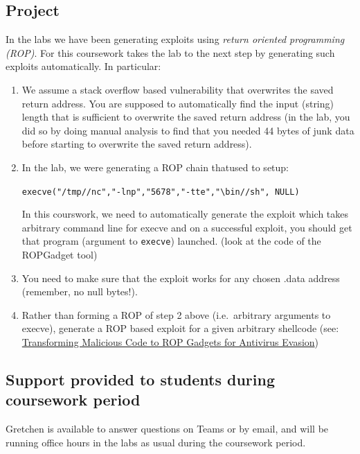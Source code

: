 \documentclass{article}
\begin{document}
\subsection*{Project}

In the labs we have been generating exploits using \emph{return oriented programming (ROP)}. For this coursework
takes the lab to the next step by generating such exploits
automatically. In particular:

\begin{enumerate}
\item We assume a stack overflow based vulnerability that overwrites the
  saved return address. You are supposed to automatically find the input
  (string) length that is sufficient to overwrite the saved return address (in the
  lab, you did so by doing manual analysis to find that you needed 44
  bytes of junk data before starting to overwrite the saved return address).

\item In the lab, we were generating a ROP chain thatused to setup:

  \texttt{execve("/tmp//nc","-lnp","5678","-tte","\textbackslash bin//sh",
    NULL)}

  In this courswork, we need to automatically generate the exploit
  which takes arbitrary command line for execve and on a successful
  exploit, you should get that program (argument to \texttt{execve})
  launched. (look at the code of the ROPGadget tool)

\item You need to make sure that the exploit works for any chosen .data
  address (remember, no null bytes!).

\item Rather than forming a ROP of step 2 above (i.e.~arbitrary arguments
  to execve), generate a ROP based exploit for a given arbitrary shellcode
  (see: 
  \href{https://ietresearch.onlinelibrary.wiley.com/doi/epdf/10.1049/iet-ifs.2018.5386}{Transforming Malicious Code to ROP Gadgets for Antivirus
    Evasion})
\end{enumerate}

\subsection*{Support provided to students during coursework period}

Gretchen is available to answer questions on Teams or by
email, and will be running office hours in the labs as usual during the coursework period. 
\end{document}
